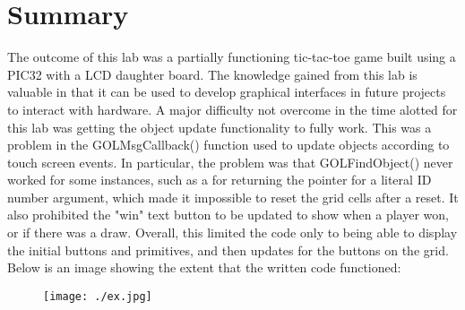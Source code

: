 \documentclass[12pt]{article}
\begin{document}
\section{Summary}
The outcome of this lab was a partially functioning tic-tac-toe game built using a PIC32 with a LCD daughter board. The knowledge gained from this lab is valuable in that it can be used to develop graphical interfaces in future projects to interact with hardware. A major difficulty not overcome in the time alotted for this lab was getting the object update functionality to fully work. This was a problem in the GOLMsgCallback() function used to update objects according to touch screen events. In particular, the problem was that GOLFindObject() never worked for some instances, such as a for returning the pointer for a literal ID number argument, which made it impossible to reset the grid cells after a reset. It also prohibited the "win" text button to be updated to show when a player won, or if there was a draw. Overall, this limited the code only to being able to display the initial buttons and primitives, and then updates for the buttons on the grid. Below is an image showing the extent that the written code functioned:

\FloatBarrier
\begin{figure}[h!]
\begin{center}
 \texttt{[image: ./ex.jpg]}
\end{center}
\end{figure}
\FloatBarrier
\end{document}
